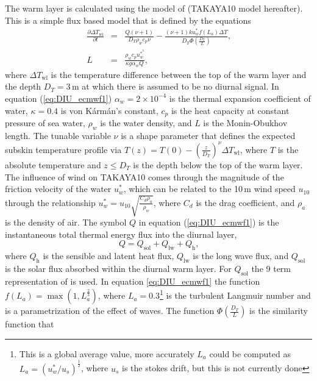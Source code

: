 \documentclass[../main/NEMO_manual]{subfiles}
\begin{document}
The warm layer is calculated using the model of \citet{takaya.bidlot.ea_JGR10} (TAKAYA10 model hereafter).
This is a simple flux based model that is defined by the equations
\begin{align}
\frac{\partial{\Delta T_{\mathrm{wl}}}}{\partial{t}}&=&\frac{Q(\nu+1)}{D_T\rho_w c_p
\nu}-\frac{(\nu+1)ku^*_{w}f(L_a)\Delta T}{D_T\Phi\!\left(\frac{D_T}{L}\right)} \mbox{,}
\label{eq:DIU_ecmwf1} \\
L&=&\frac{\rho_w c_p u^{*^3}_{w}}{\kappa g \alpha_w Q }\mbox{,}\label{eq:DIU_ecmwf2}
\end{align}
where $\Delta T_{\mathrm{wl}}$ is the temperature difference between the top of the warm layer and the depth $D_T=3$\,m at which there is assumed to be no diurnal signal.
In equation (\autoref{eq:DIU_ecmwf1}) $\alpha_w=2\times10^{-4}$ is the thermal expansion coefficient of water,
$\kappa=0.4$ is von K\'{a}rm\'{a}n's constant, $c_p$ is the heat capacity at constant pressure of sea water,
$\rho_w$ is the water density, and $L$ is the Monin-Obukhov length.
The tunable variable $\nu$ is a shape parameter that defines the expected subskin temperature profile via
$T(z) = T(0) - \left( \frac{z}{D_T} \right)^\nu \Delta T_{\mathrm{wl}}$,
where $T$ is the absolute temperature and $z\le D_T$ is the depth below the top of the warm layer.
The influence of wind on TAKAYA10 comes through the magnitude of the friction velocity of the water $u^*_{w}$,
which can be related to the 10\,m wind speed $u_{10}$ through
the relationship $u^*_{w} = u_{10}\sqrt{\frac{C_d\rho_a}{\rho_w}}$, where $C_d$ is the drag coefficient,
and $\rho_a$ is the density of air.
The symbol $Q$ in equation (\autoref{eq:DIU_ecmwf1}) is the instantaneous total thermal energy flux into
the diurnal layer, \ie
\[
  Q = Q_{\mathrm{sol}} + Q_{\mathrm{lw}} + Q_{\mathrm{h}}\mbox{,}
\]
where $Q_{\mathrm{h}}$ is the sensible and latent heat flux, $Q_{\mathrm{lw}}$ is the long wave flux,
and $Q_{\mathrm{sol}}$ is the solar flux absorbed within the diurnal warm layer.
For $Q_{\mathrm{sol}}$ the 9 term representation of \citet{gentemann.minnett.ea_JGR09} is used.
In equation \autoref{eq:DIU_ecmwf1} the function $f(L_a)=\max(1,L_a^{\frac{2}{3}})$,
where $L_a=0.3$\footnote{
  This is a global average value, more accurately $L_a$ could be computed as $L_a=(u^*_{w}/u_s)^{\frac{1}{2}}$,
  where $u_s$ is the stokes drift, but this is not currently done
} is the turbulent Langmuir number and is a parametrization of the effect of waves.
The function $\Phi\!\left(\frac{D_T}{L}\right)$ is the similarity function that
\end{document}
